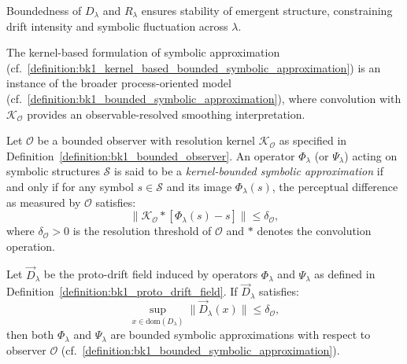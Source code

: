 \begin{scholium}
\label{scholium:bk1_consequences_of_bounded_pre_geometric_operations}
Boundedness of $D_\lambda$ and $R_\lambda$ ensures stability of emergent structure, constraining drift intensity and symbolic fluctuation across $\lambda$.
\end{scholium}

\begin{remark}
The kernel-based formulation of symbolic approximation (cf.~\ref{definition:bk1_kernel_based_bounded_symbolic_approximation}) is an instance of the broader process-oriented model (cf.~\ref{definition:bk1_bounded_symbolic_approximation}), where convolution with $\mathcal{K}_\mathcal{O}$ provides an observable-resolved smoothing interpretation.
\end{remark}

\begin{definition}
\label{definition:bk1_kernel_based_bounded_symbolic_approximation}
Let $\mathcal{O}$ be a bounded observer with resolution kernel $\mathcal{K}_\mathcal{O}$ as specified in Definition~\ref{definition:bk1_bounded_observer}. An operator $\Phi_\lambda$ (or $\Psi_\lambda$) acting on symbolic structures $\mathcal{S}$ is said to be a \emph{kernel-bounded symbolic approximation} if and only if for any symbol $s \in \mathcal{S}$ and its image $\Phi_\lambda(s)$, the perceptual difference as measured by $\mathcal{O}$ satisfies:
\begin{equation}
\|\mathcal{K}_\mathcal{O} \ast [\Phi_\lambda(s) - s]\| \leq \delta_\mathcal{O},
\end{equation}
where $\delta_\mathcal{O} > 0$ is the resolution threshold of $\mathcal{O}$ and $\ast$ denotes the convolution operation.
\end{definition}

\begin{proposition}
\label{proposition:bk1_boundedness_from_drift}
Let $\vec{D}_\lambda$ be the proto-drift field induced by operators $\Phi_\lambda$ and $\Psi_\lambda$ as defined in Definition~\ref{definition:bk1_proto_drift_field}. If $\vec{D}_\lambda$ satisfies:
\begin{equation}
\sup_{x \in \mathrm{dom}(D_\lambda)} \|\vec{D}_\lambda(x)\| \leq \delta_\mathcal{O},
\end{equation}
then both $\Phi_\lambda$ and $\Psi_\lambda$ are bounded symbolic approximations with respect to observer $\mathcal{O}$ (cf.~\ref{definition:bk1_bounded_symbolic_approximation}).
\end{proposition}

